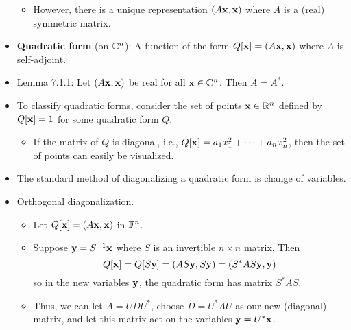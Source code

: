 \documentclass[../../notes.tex]{subfiles}
\begin{document}
\begin{itemize}
    \begin{itemize}
        \item However, there is a unique representation $(A\mathbf{x},\mathbf{x})$ where $A$ is a (real) symmetric matrix.
    \end{itemize}
    \item \textbf{Quadratic form} (on $\mathbb{C}^n$): A function of the form $Q[\mathbf{x}]=(A\mathbf{x},\mathbf{x})$ where $A$ is self-adjoint.
    \item Lemma 7.1.1: Let $(A\mathbf{x},\mathbf{x})$ be real for all $\mathbf{x}\in\mathbb{C}^n$. Then $A=A^*$.
    \item To classify quadratic forms, consider the set of points $\mathbf{x}\in\mathbb{R}^n$ defined by $Q[\mathbf{x}]=1$ for some quadratic form $Q$.
    \begin{itemize}
        \item If the matrix of $Q$ is diagonal, i.e., $Q[\mathbf{x}]=a_1x_1^2+\cdots+a_nx_n^2$, then the set of points can easily be visualized.
    \end{itemize}
    \item The standard method of diagonalizing a quadratic form is change of variables.
    \item Orthogonal diagonalization.
    \begin{itemize}
        \item Let $Q[\mathbf{x}]=(A\mathbf{x},\mathbf{x})$ in $\mathbb{F}^n$.
        \item Suppose $\mathbf{y}=S^{-1}\mathbf{x}$ where $S$ is an invertible $n\times n$ matrix. Then
        \begin{equation*}
            Q[\mathbf{x}] = Q[S\mathbf{y}] = (AS\mathbf{y},S\mathbf{y}) = (S^*AS\mathbf{y},\mathbf{y})
        \end{equation*}
        so in the new variables $\mathbf{y}$, the quadratic form has matrix $S^*AS$.
        \item Thus, we can let $A=UDU^*$, choose $D=U^*AU$ as our new (diagonal) matrix, and let this matrix act on the variables $\mathbf{y}=U^*\mathbf{x}$.

\end{itemize}
\end{itemize}
\end{document}
